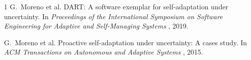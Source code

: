 \documentclass[oneside,openany,a4paper,12pt]{article}
\begin{document}

\begin{thebibliography}{1}
G.~Moreno et al.
\newblock DART: A software exemplar for self-adaptation under uncertainty.
\newblock In {\em Proceedings of the International Symposium on Software Engineering for Adaptive and Self-Managing Systems }, 2019.

G.~Moreno et al.
\newblock Proactive self-adaptation under uncertainty: A cases study.
\newblock In {\em ACM Transactions on Autonomous and Adaptive Systems }, 2015.
\end{thebibliography}
\end{document}
